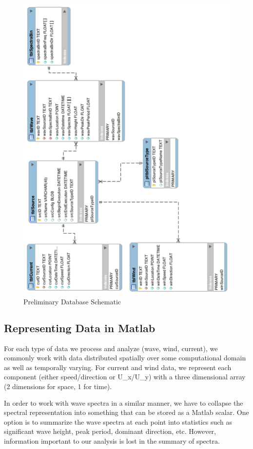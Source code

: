 \documentclass[11pt,letterpaper,oneside,reqno]{article}
\begin{document}
\begin{figure}
\includegraphics{../images/wave-database-20100720.png}
\caption{Preliminary Database Schematic}
\label{db-schematic}
\end{figure}

\subsection{Representing Data in Matlab}

For each type of data we process and analyze (wave, wind, current),
we commonly work with data distributed spatially over some
computational domain as well as temporally varying. For current and
wind data, we represent each component (either speed/direction or
U\_x/U\_y) with a three dimensional array (2 dimensions for space,
1 for time).

In order to work with wave spectra in a similar manner, we have to
collapse the spectral representation into something that can be
stored as a Matlab scalar. One option is to summarize the wave
spectra at each point into statistics such as significant wave
height, peak period, dominant direction, etc. However, information
important to our analysis is lost in the summary of spectra.
\end{document}
